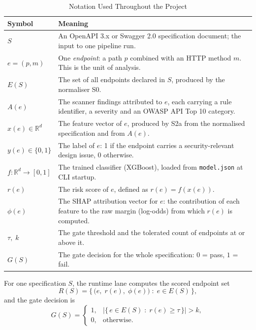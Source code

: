 \documentclass[conference]{IEEEtran}
\begin{document}
\begin{table}[!t]
\caption{Notation Used Throughout the Project}
\label{tab:notation}
\centering
\footnotesize
\begin{tabularx}{\textwidth}{L{2.6cm} Y}
\toprule
\textbf{Symbol} & \textbf{Meaning}\\
\midrule
$S$ & An OpenAPI 3.x or Swagger 2.0 specification document; the input to one pipeline run.\\
$e=(p,m)$ & One \emph{endpoint}: a path $p$ combined with an HTTP method $m$. This is the
unit of analysis.\\
$E(S)$ & The set of all endpoints declared in $S$, produced by the normaliser S0.\\
$A(e)$ & The scanner findings attributed to $e$, each carrying a rule identifier, a severity
and an OWASP API Top 10 category.\\
$x(e)\in\mathbb{R}^{d}$ & The feature vector of $e$, produced by S2a from the normalised
specification and from $A(e)$.\\
$y(e)\in\{0,1\}$ & The label of $e$: 1 if the endpoint carries a security-relevant design
issue, 0 otherwise.\\
$f:\mathbb{R}^{d}\!\rightarrow\![0,1]$ & The trained classifier (XGBoost), loaded from
\texttt{model.json} at CLI startup.\\
$r(e)$ & The risk score of $e$, defined as $r(e)=f(x(e))$.\\
$\phi(e)$ & The SHAP attribution vector for $e$: the contribution of each feature to the raw margin
(log-odds) from which $r(e)$ is computed.\\
$\tau,\;k$ & The gate threshold and the tolerated count of endpoints at or above it.\\
$G(S)$ & The gate decision for the whole specification: $0$ = pass, $1$ = fail.\\
\bottomrule
\end{tabularx}
\end{table}

For one specification $S$, the runtime lane computes the scored endpoint set
\begin{equation}
R(S)=\bigl\{\,\bigl(e,\;r(e),\;\phi(e)\bigr)\;:\;e\in E(S)\,\bigr\},
\label{eq:scored}
\end{equation}
and the gate decision is
\begin{equation}
G(S)=
\begin{cases}
1, & \bigl|\{\,e\in E(S)\;:\;r(e)\ge\tau\,\}\bigr| > k,\\[2pt]
0, & \text{otherwise.}
\end{cases}
\label{eq:gate}
\end{equation}
\end{document}
